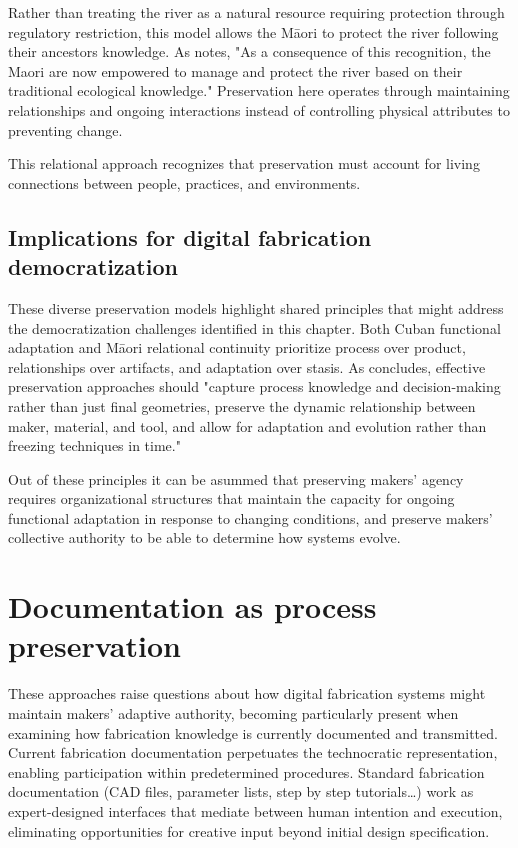 Rather than treating the river as a natural resource requiring protection through regulatory restriction, this model allows the Māori to protect the river following their ancestors knowledge. As \citet{vijaykuma2019} notes, "As a consequence of this recognition, the Maori are now empowered to manage and protect the river based on their traditional ecological knowledge." Preservation here operates through maintaining relationships and ongoing interactions instead of controlling physical attributes to preventing change.

\vspace{0.5cm}

This relational approach recognizes that preservation must account for living connections between people, practices, and environments.

\subsection{Implications for digital fabrication democratization}

These diverse preservation models highlight shared principles that might address the democratization challenges identified in this chapter. Both Cuban functional adaptation and Māori relational continuity prioritize process over product, relationships over artifacts, and adaptation over stasis. As \citet{munoz_zanon_2025_16211937} concludes, effective preservation approaches should "capture process knowledge and decision-making rather than just final geometries, preserve the dynamic relationship between maker, material, and tool, and allow for adaptation and evolution rather than freezing techniques in time."

\vspace{0.5cm}

Out of these principles it can be asummed that preserving makers' agency requires organizational structures that maintain the capacity for ongoing functional adaptation in response to changing conditions, and preserve makers' collective authority to be able to determine how systems evolve.

\section{Documentation as process preservation}

These approaches raise questions about how digital fabrication systems might maintain makers' adaptive authority, becoming particularly present when examining how fabrication knowledge is currently documented and transmitted. Current fabrication documentation perpetuates the technocratic representation, enabling participation within predetermined procedures. Standard fabrication documentation (CAD files, parameter lists, step by step tutorials\dots) work as expert-designed interfaces that mediate between human intention and execution, eliminating opportunities for creative input beyond initial design specification.

